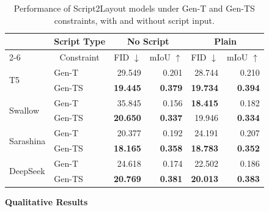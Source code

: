 \begin{table}[t]
  \hfill
  \begin{minipage}{0.48\textwidth}
  \centering
  \caption{
  Performance of Script2Layout models under Gen-T and Gen-TS constraints, with and without script input.
  }
  \vspace{-1.0em}
  {\setlength{\tabcolsep}{3pt}
  \begin{tabular}{llrrrr}
  \toprule
  &\multicolumn{1}{r}{Script Type} & \multicolumn{2}{c}{No Script} & \multicolumn{2}{c}{Plain} \\
  \cmidrule{2-6}
  \multicolumn{1}{c}{Model} & \multicolumn{1}{c}{Constraint} & \multicolumn{1}{c}{FID $\downarrow$} & \multicolumn{1}{c}{mIoU $\uparrow$} & \multicolumn{1}{c}{FID $\downarrow$} & \multicolumn{1}{c}{mIoU $\uparrow$} \\
  \midrule
  \multirow{2}{*}{T5} & Gen-T   & 29.549          & 0.201          & 28.744          & 0.210 \\
                      & Gen-TS  & \textbf{19.445} & \textbf{0.379} & \textbf{19.734} & \textbf{0.394} \\ 
  \midrule
  \multirow{2}{*}{Swallow} & Gen-T   & 35.845          & 0.156          & \textbf{18.415} & 0.182 \\
                           & Gen-TS  & \textbf{20.650} & \textbf{0.337} & 19.946          & \textbf{0.334} \\ 
  \midrule
  \multirow{2}{*}{Sarashina} & Gen-T   & 20.377          & 0.192 & 24.191          & 0.207 \\
                             & Gen-TS  & \textbf{18.165} & \textbf{0.358}          & \textbf{18.783} & \textbf{0.352} \\ 
  \midrule
  \multirow{2}{*}{DeepSeek} & Gen-T   & 24.618          & 0.174          & 22.502 & 0.186 \\
                            & Gen-TS  & \textbf{20.769} & \textbf{0.381} & \textbf{20.013}          & \textbf{0.383} \\
  \bottomrule
  \end{tabular}
  }
  \label{tab:constraint_Script2Layoyut}
  \end{minipage}
  \vspace{-0.5em}
  \end{table}

\vspace{3em}
\noindent\textbf{Qualitative Results} 

